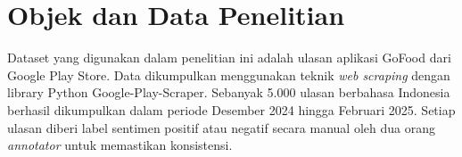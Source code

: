 \section{Objek dan Data Penelitian}

Dataset yang digunakan dalam penelitian ini adalah ulasan aplikasi GoFood dari Google Play Store. Data dikumpulkan menggunakan teknik \emph{web scraping} dengan library Python Google-Play-Scraper. Sebanyak 5.000 ulasan berbahasa Indonesia berhasil dikumpulkan dalam periode Desember 2024 hingga Februari 2025. Setiap ulasan diberi label sentimen positif atau negatif secara manual oleh dua orang \emph{annotator} untuk memastikan konsistensi.
